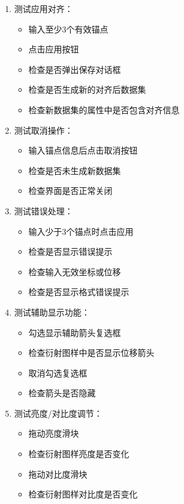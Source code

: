 \documentclass[a4paper,12pt]{report}	%
\begin{document}
\begin{enumerate}
    \item 测试应用对齐：
    \begin{itemize}
        \item 输入至少3个有效锚点
        \item 点击应用按钮
        \item 检查是否弹出保存对话框
        \item 检查是否生成新的对齐后数据集
        \item 检查新数据集的属性中是否包含对齐信息
    \end{itemize}

    \item 测试取消操作：
    \begin{itemize}
        \item 输入锚点信息后点击取消按钮
        \item 检查是否未生成新数据集
        \item 检查界面是否正常关闭
    \end{itemize}

    \item 测试错误处理：
    \begin{itemize}
        \item 输入少于3个锚点时点击应用
        \item 检查是否显示错误提示
        \item 检查输入无效坐标或位移
        \item 检查是否显示格式错误提示
    \end{itemize}

    \item 测试辅助显示功能：
    \begin{itemize}
        \item 勾选显示辅助箭头复选框
        \item 检查衍射图样中是否显示位移箭头
        \item 取消勾选复选框
        \item 检查箭头是否隐藏
    \end{itemize}

    \item 测试亮度/对比度调节：
    \begin{itemize}
        \item 拖动亮度滑块
        \item 检查衍射图样亮度是否变化
        \item 拖动对比度滑块
        \item 检查衍射图样对比度是否变化
    \end{itemize}
\end{enumerate}
\end{document}
